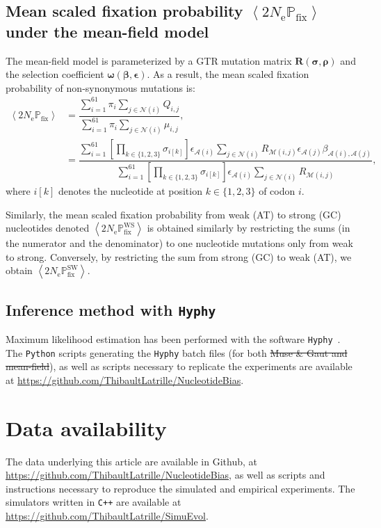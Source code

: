 \documentclass{article}
\newcommand{\UniDimArray}[1]{\bm{#1}} %
\newcommand{\BiDimArray}[1]{\bm{#1}} %
\newcommand{\Ne}{N_{\text{e}}} %
\newcommand{\proba}{\mathbb{P}} %
\newcommand{\Pfix}{2 \Ne \proba_{\text{fix}}} %
\newcommand{\mutmatrix}{R} %
\newcommand{\Mutmatrix}{\BiDimArray{\mutmatrix}} %
\newcommand{\exchan}{\rho} %
\newcommand{\Exchan}{\UniDimArray{\exchan}} %
\newcommand{\mutequi}{\sigma} %
\newcommand{\Mutequi}{\UniDimArray{\mutequi}} %
\newcommand{\ci}{{i}} %
\newcommand{\cj}{{j}} %
\newcommand{\sumOverCodons}{_{\ci=1}^{61}} %
\newcommand{\itoj}{\ci, \cj} %
\newcommand{\nuc}{\mathcal{M}} %
\newcommand{\nucitoj}{\nuc(\itoj)} %
\newcommand{\subequi}{\pi} %
\newcommand{\aaMap}{\mathcal{A}} %
\newcommand{\aai}{\aaMap(\ci)} %
\newcommand{\aaj}{\aaMap(\cj)} %
\newcommand{\avgpfix}{\left\langle \Pfix \right\rangle } %
\newcommand{\avgpfixATtoGC}{\left\langle \Pfix^{\text{WS}} \right\rangle } %
\newcommand{\avgpfixGCtoAT}{\left\langle \Pfix^{\text{SW}} \right\rangle } %
\newcommand{\AAexchan}{\beta} %
\newcommand{\AAExchan}{\UniDimArray{\AAexchan}} %
\newcommand{\AAequi}{\epsilon} %
\newcommand{\AAEqui}{\UniDimArray{\AAequi}} %
\newcommand{\NonSynNeighbors}{\mathcal{N}} %
\newcommand{\setNonSynNeighbors}{\NonSynNeighbors\left(\ci\right)} %
\providecommand{\DIFaddtex}[1]{{\protect\color{blue}\uwave{#1}}} %
\providecommand{\DIFdeltex}[1]{{\protect\color{red}\sout{#1}}}                      %
\providecommand{\DIFaddbegin}{} %
\providecommand{\DIFaddend}{} %
\providecommand{\DIFdelbegin}{} %
\providecommand{\DIFdelend}{} %
\providecommand{\DIFadd}[1]{\texorpdfstring{\DIFaddtex{#1}}{#1}} %
\providecommand{\DIFdel}[1]{\texorpdfstring{\DIFdeltex{#1}}{}} %
\begin{document}
\subsection{Mean scaled fixation probability $\avgpfix$ under the mean-field model}
\label{sec:mut-bias-mean-field-omega}
The mean-field model is parameterized by a {GTR} mutation matrix $\Mutmatrix(\Mutequi, \Exchan)$ and the selection coefficient $\UniDimArray{\omega}(\AAExchan, \AAEqui)$.
As a result, the mean scaled fixation probability of {non-synonymous} mutations is:
\begin{align}
 \avgpfix & = \dfrac{ \sum\limits\sumOverCodons \subequi_{\ci} \sum\limits_{\cj \in \setNonSynNeighbors} Q_{\itoj}}{ \sum\limits\sumOverCodons \subequi_{\ci} \sum\limits_{\cj \in \setNonSynNeighbors} \mu_{\itoj}}, \\
 & = \dfrac{ \sum\limits\sumOverCodons \left[\prod\limits_{k \in \{ 1, 2, 3 \}} \mutequi_{\ci[k]}\right] \AAequi_{\aai} \sum\limits_{\cj \in \setNonSynNeighbors} \mutmatrix_{\nucitoj} \AAequi_{\aaj} \AAexchan_{\aai, \aaj} }{\sum\limits\sumOverCodons \left[\prod\limits_{k \in \{ 1, 2, 3 \}} \mutequi_{\ci[k]}\right] \AAequi_{\aai} \sum\limits_{\cj \in \setNonSynNeighbors} \mutmatrix_{\nucitoj}},
\end{align}
where $\ci[k]$ denotes the nucleotide at position $k \in \{ 1, 2, 3 \}$ of codon $i$.

Similarly, the mean scaled fixation probability from weak (AT) to strong (GC) nucleotides denoted $\avgpfixATtoGC$ is obtained similarly by restricting the sums (in the numerator and the denominator) to one nucleotide mutations only from weak to strong.
Conversely, by restricting the sum from strong (GC) to weak (AT), we obtain $\avgpfixGCtoAT$.

\subsection{Inference method with \texttt{Hyphy}}
\label{subsec:inference-method-with-hyphy}

Maximum {likelihood} estimation has been performed with the software \texttt{Hyphy}~\citep{Pond2005}.
The \texttt{Python} scripts generating the \texttt{Hyphy} batch files (for both \DIFdelbegin \DIFdel{Muse \& Gaut and mean-field}\DIFdelend \DIFaddbegin \DIFadd{MG and MF}\DIFaddend ), as well as scripts necessary to replicate the experiments are available at \url{https://github.com/ThibaultLatrille/NucleotideBias}.

\section{Data availability}
The data underlying this article are available in Github, at \url{https://github.com/ThibaultLatrille/NucleotideBias}, as well as scripts and instructions necessary to reproduce the simulated and empirical experiments.
The simulators written in \texttt{C++} are available at \url{https://github.com/ThibaultLatrille/SimuEvol}.
\end{document}
